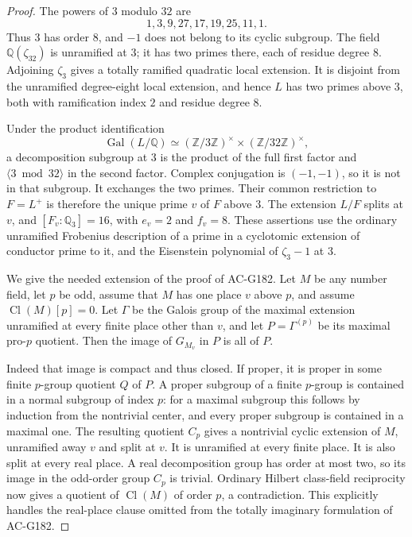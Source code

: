 \begin{proof}
The powers of $3$ modulo $32$ are
\[
            1,3,9,27,17,19,25,11,1.
 \tag{N32.5}
\]
Thus $3$ has order $8$, and $-1$ does not belong to its cyclic
subgroup.  The field $\mathbb Q(\zeta_{32})$ is unramified at $3$;
it has two primes there, each of residue degree $8$.
Adjoining $\zeta_3$ gives a totally ramified quadratic local
extension.  It is disjoint from the unramified degree-eight local
extension, and hence $L$ has two primes above $3$, both with
ramification index $2$ and residue degree $8$.

Under the product identification
\[
 \operatorname{Gal}(L/\mathbb Q)
  \simeq (\mathbb Z/3\mathbb Z)^\times
             \times(\mathbb Z/32\mathbb Z)^\times,
 \tag{N32.6}
\]
a decomposition subgroup at $3$ is the product of the full first
factor and $\langle3\bmod32\rangle$ in the second factor.
Complex conjugation is $(-1,-1)$, so it is not in that subgroup.
It exchanges the two primes.  Their common restriction to $F=L^+$
is therefore the unique prime $v$ of $F$ above $3$.
The extension $L/F$ splits at $v$, and
$[F_v:\mathbb Q_3]=16$, with $e_v=2$ and $f_v=8$.
These assertions use the ordinary unramified Frobenius description
of a prime in a cyclotomic extension of conductor prime to it,
and the Eisenstein polynomial of $\zeta_3-1$ at $3$.

We give the needed extension of the proof of AC-G182.
Let $M$ be any number field, let $p$ be odd, assume that $M$ has
one place $v$ above $p$, and assume $\operatorname{Cl}(M)[p]=0$.
Let $\Gamma$ be the Galois group of the maximal extension
unramified at every finite place other than $v$, and let
$P=\Gamma^{(p)}$ be its maximal pro-$p$ quotient.
Then the image of $G_{M_v}$ in $P$ is all of $P$.

Indeed that image is compact and thus closed.  If proper, it is
proper in some finite $p$-group quotient $Q$ of $P$.
A proper subgroup of a finite $p$-group is contained in a normal
subgroup of index $p$: for a maximal subgroup this follows by
induction from the nontrivial center, and every proper subgroup
is contained in a maximal one.  The resulting quotient $C_p$
gives a nontrivial cyclic extension of $M$, unramified away $v$
and split at $v$.  It is unramified at every finite place.
It is also split at every real place.  A real decomposition group
has order at most two, so its image in the odd-order group $C_p$
is trivial.  Ordinary Hilbert class-field reciprocity now gives
a quotient of $\operatorname{Cl}(M)$ of order $p$, a contradiction.
This explicitly handles the real-place clause omitted from the
totally imaginary formulation of AC-G182.


\end{proof}

